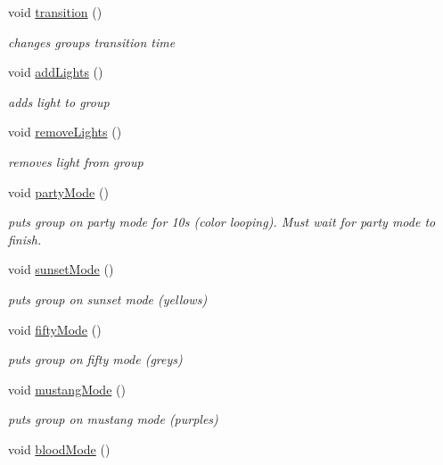 \begin{DoxyCompactItemize}
void \hyperlink{class_single_groups_control_widget_a7ac224c22be007e2e3d944a5d93a2778}{transition} ()
\begin{DoxyCompactList}\small\item\em changes group\textquotesingle{}s transition time \end{DoxyCompactList}\item 
void \hyperlink{class_single_groups_control_widget_a3d83beb8c90183e11332bba1a4eab77d}{add\+Lights} ()
\begin{DoxyCompactList}\small\item\em adds light to group \end{DoxyCompactList}\item 
void \hyperlink{class_single_groups_control_widget_ab0729c8bad3c8ba43a22ed1af23ac6e7}{remove\+Lights} ()
\begin{DoxyCompactList}\small\item\em removes light from group \end{DoxyCompactList}\item 
void \hyperlink{class_single_groups_control_widget_a558dac00b479b6640de62b4812802250}{party\+Mode} ()
\begin{DoxyCompactList}\small\item\em puts group on party mode for 10s (color looping). Must wait for party mode to finish. \end{DoxyCompactList}\item 
void \hyperlink{class_single_groups_control_widget_a6cb68bd462d888756deba16b4e524470}{sunset\+Mode} ()
\begin{DoxyCompactList}\small\item\em puts group on sunset mode (yellows) \end{DoxyCompactList}\item 
void \hyperlink{class_single_groups_control_widget_a98a8fc3336b6d6a0ab087936c74955cc}{fifty\+Mode} ()
\begin{DoxyCompactList}\small\item\em puts group on fifty mode (greys) \end{DoxyCompactList}\item 
void \hyperlink{class_single_groups_control_widget_ad378bb04e410f93fd50eddc38c47d6d9}{mustang\+Mode} ()
\begin{DoxyCompactList}\small\item\em puts group on mustang mode (purples) \end{DoxyCompactList}\item 
void \hyperlink{class_single_groups_control_widget_a88810651632c7525970a816bdaa47d09}{blood\+Mode} ()

\end{DoxyCompactItemize}
